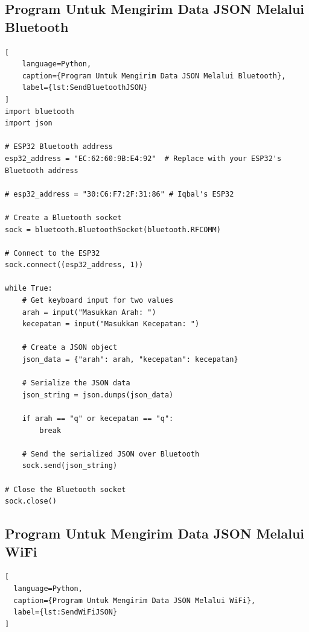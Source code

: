 \subsection{Program Untuk Mengirim Data JSON Melalui Bluetooth}

\begin{lstlisting}[
    language=Python,
    caption={Program Untuk Mengirim Data JSON Melalui Bluetooth},
    label={lst:SendBluetoothJSON}
]
import bluetooth
import json

# ESP32 Bluetooth address
esp32_address = "EC:62:60:9B:E4:92"  # Replace with your ESP32's Bluetooth address

# esp32_address = "30:C6:F7:2F:31:86" # Iqbal's ESP32

# Create a Bluetooth socket
sock = bluetooth.BluetoothSocket(bluetooth.RFCOMM)

# Connect to the ESP32
sock.connect((esp32_address, 1))

while True:
    # Get keyboard input for two values
    arah = input("Masukkan Arah: ")
    kecepatan = input("Masukkan Kecepatan: ")
    
    # Create a JSON object
    json_data = {"arah": arah, "kecepatan": kecepatan}

    # Serialize the JSON data
    json_string = json.dumps(json_data)
    
    if arah == "q" or kecepatan == "q":
        break

    # Send the serialized JSON over Bluetooth
    sock.send(json_string)

# Close the Bluetooth socket
sock.close()

\end{lstlisting}

\subsection{Program Untuk Mengirim Data JSON Melalui WiFi}

\begin{lstlisting}[
  language=Python,
  caption={Program Untuk Mengirim Data JSON Melalui WiFi},
  label={lst:SendWiFiJSON}
]

\end{lstlisting}